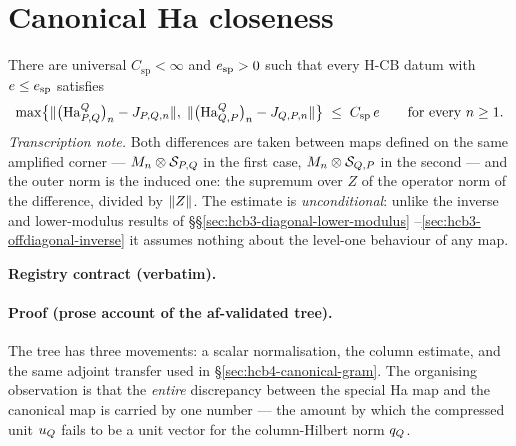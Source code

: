 \section{Canonical Ha closeness}\label{sec:hcb4-canonical-closeness}

\begin{lemma}\label{lem:hcb4-canonical-closeness}
There are universal $C_{\mathrm{sp}}<\infty$ and $e_{\mathrm{sp}}>0$ such that every
H-CB datum with $e\le e_{\mathrm{sp}}$ satisfies
\begin{equation}\label{eq:cc-main}
  \max\bigl\{\lVert\bigl(\mathrm{Ha}^{Q}_{P,Q}\bigr)_{n}-J_{P,Q,n}\rVert,\;
             \lVert\bigl(\mathrm{Ha}^{Q}_{Q,P}\bigr)_{n}-J_{Q,P,n}\rVert\bigr\}
  \;\le\;C_{\mathrm{sp}}\,e
  \qquad\text{for every }n\ge1 .
\end{equation}
\emph{Transcription note.} Both differences are taken between maps defined on the same
amplified corner --- $M_{n}\otimes \mathcal S_{P,Q}$ in the first case, $M_{n}\otimes \mathcal S_{Q,P}$ in the
second --- and the outer norm is the induced one: the supremum over $Z$ of the operator
norm of the difference, divided by $\lVert Z\rVert$. The estimate is \emph{unconditional}: unlike
the inverse and lower-modulus results of \S\S\ref{sec:hcb3-diagonal-lower-modulus}
--\ref{sec:hcb3-offdiagonal-inverse} it assumes nothing about the level-one behaviour of
any map.
\end{lemma}

\noindent\textbf{Registry contract (verbatim).}

\paragraph{Proof (prose account of the af-validated tree).}
The tree has three movements: a scalar normalisation, the column estimate, and the same
adjoint transfer used in \S\ref{sec:hcb4-canonical-gram}. The organising observation is
that the \emph{entire} discrepancy between the special Ha map and the canonical map is
carried by one number --- the amount by which the compressed unit $u_{Q}$ fails to be
a unit vector for the column-Hilbert norm $q_{Q}$.

